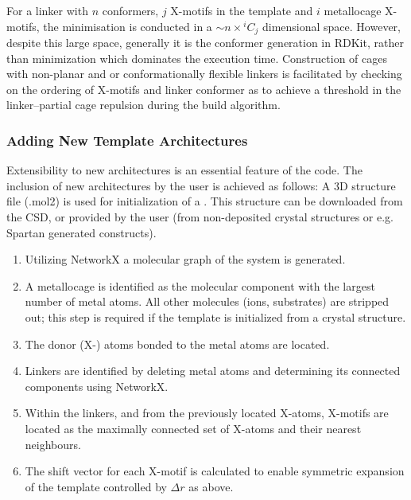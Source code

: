 \documentclass[../../main.tex]{subfiles}
\begin{document}
For a linker with $n$ conformers, $j$ X-motifs in the template and $i$ metallocage X-motifs, the minimisation is conducted in a $\sim n \times {}^iC_j$ dimensional space. However, despite this large space, generally it is the conformer generation in RDKit, rather than minimization which dominates the execution time. Construction of cages with non-planar and or conformationally flexible linkers is facilitated by checking on the ordering of X-motifs and linker conformer as to achieve a threshold in the linker–partial cage repulsion during the build algorithm.


\subsubsection{Adding New Template Architectures} 
\label{section::cg_2_2_2}

Extensibility to new architectures is an essential feature of the code. The inclusion of new architectures by the user is achieved as follows: A 3D structure file (.mol2) is used for initialization of a . This structure can be downloaded from the CSD, or provided by the user (from non-deposited crystal structures or e.g. Spartan\cite{Young2001} generated constructs). 

\begin{enumerate}[label=\Roman*.$\quad$]
	\item Utilizing NetworkX a molecular graph of the system is generated. 
	
	\item A metallocage is identified as the molecular component with the largest number of metal atoms. All other molecules (ions, substrates) are stripped out; this step is required if the template is initialized from a crystal structure. 
	
	\item The donor (X-) atoms bonded to the metal atoms are located. 
	
	\item Linkers are identified by deleting metal atoms and determining its connected components using NetworkX.
	
	\item Within the linkers, and from the previously located X-atoms, X-motifs are located as the maximally connected set of X-atoms and their nearest neighbours.
	
	\item The shift vector for each X-motif is calculated to enable symmetric expansion of the template controlled by $\Delta r$ as above. 
\end{enumerate}
\end{document}
